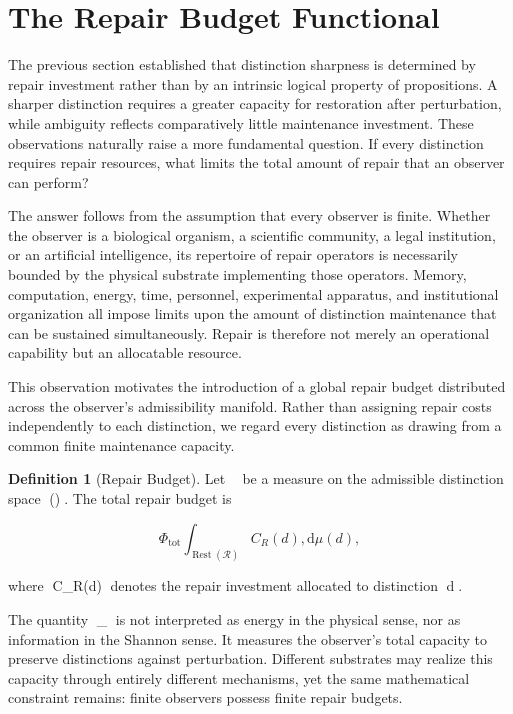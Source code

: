 \documentclass[12pt,oneside]{article}
\theoremstyle{plain}
\theoremstyle{definition}
\newtheorem{definition}[theorem]{Definition}
\theoremstyle{remark}
\DeclareMathOperator{\Rest}{Rest}
\begin{document}
\section{The Repair Budget Functional}

The previous section established that distinction sharpness is determined by repair investment rather than by an intrinsic logical property of propositions. A sharper distinction requires a greater capacity for restoration after perturbation, while ambiguity reflects comparatively little maintenance investment. These observations naturally raise a more fundamental question. If every distinction requires repair resources, what limits the total amount of repair that an observer can perform?

The answer follows from the assumption that every observer is finite. Whether the observer is a biological organism, a scientific community, a legal institution, or an artificial intelligence, its repertoire of repair operators is necessarily bounded by the physical substrate implementing those operators. Memory, computation, energy, time, personnel, experimental apparatus, and institutional organization all impose limits upon the amount of distinction maintenance that can be sustained simultaneously. Repair is therefore not merely an operational capability but an allocatable resource.

This observation motivates the introduction of a global repair budget distributed across the observer's admissibility manifold. Rather than assigning repair costs independently to each distinction, we regard every distinction as drawing from a common finite maintenance capacity.

\begin{definition}[Repair Budget]
Let \mu be a measure on the admissible distinction space \Rest(). The total repair budget is

\[
\Phi_{\mathrm{tot}}
\int_{\Rest(\mathcal{R})}
C_R(d),
\mathrm{d}\mu(d),
\]

where C_R(d) denotes the repair investment allocated to distinction d.
\end{definition}

The quantity \Phi_{} is not interpreted as energy in the physical sense, nor as information in the Shannon sense. It measures the observer's total capacity to preserve distinctions against perturbation. Different substrates may realize this capacity through entirely different mechanisms, yet the same mathematical constraint remains: finite observers possess finite repair budgets.
\end{document}
